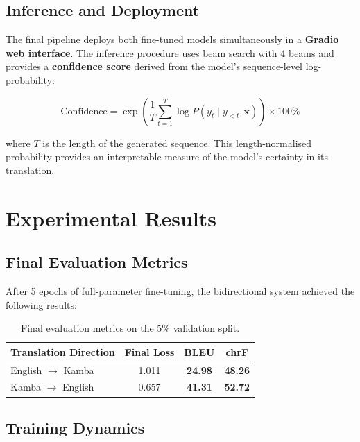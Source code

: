 \documentclass[12pt,a4paper]{article}
\begin{document}
\subsection{Inference and Deployment}

The final pipeline deploys both fine-tuned models simultaneously in a \textbf{Gradio web interface}. The inference procedure uses beam search with 4 beams and provides a \textbf{confidence score} derived from the model's sequence-level log-probability:

\begin{equation}
    \text{Confidence} = \exp\!\left(\frac{1}{T}\sum_{t=1}^{T} \log P(y_t \mid y_{<t}, \mathbf{x})\right) \times 100\%
\end{equation}

where \(T\) is the length of the generated sequence. This length-normalised probability provides an interpretable measure of the model's certainty in its translation.

\section{Experimental Results}

\subsection{Final Evaluation Metrics}

After 5 epochs of full-parameter fine-tuning, the bidirectional system achieved the following results:

\begin{table}[H]
\centering
\begin{tabular}{@{}lccc@{}}
\toprule
\textbf{Translation Direction} & \textbf{Final Loss} & \textbf{BLEU} & \textbf{chrF} \\
\midrule
English $\rightarrow$ Kamba & 1.011 & \textbf{24.98} & \textbf{48.26} \\
Kamba $\rightarrow$ English & 0.657 & \textbf{41.31} & \textbf{52.72} \\
\bottomrule
\end{tabular}
\caption{Final evaluation metrics on the 5\% validation split.}
\end{table}

\subsection{Training Dynamics}
\end{document}
